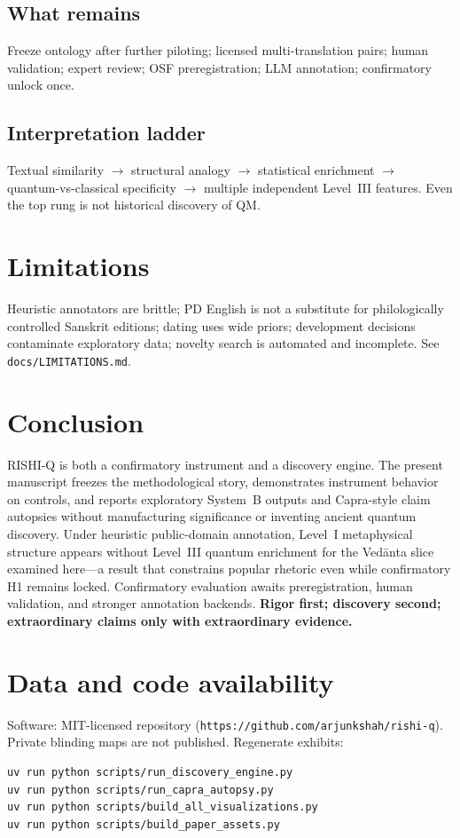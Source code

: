 \documentclass[11pt]{article}
\begin{document}
\subsection{What remains}
Freeze ontology after further piloting; licensed multi-translation pairs; human validation; expert review; OSF preregistration; LLM annotation; confirmatory unlock once.

\subsection{Interpretation ladder}
Textual similarity $\rightarrow$ structural analogy $\rightarrow$ statistical enrichment $\rightarrow$ quantum-vs-classical specificity $\rightarrow$ multiple independent Level~III features.
Even the top rung is not historical discovery of QM.

\section{Limitations}
Heuristic annotators are brittle; PD English is not a substitute for philologically controlled Sanskrit editions; dating uses wide priors; development decisions contaminate exploratory data; novelty search is automated and incomplete.
See \texttt{docs/LIMITATIONS.md}.

\section{Conclusion}
RISHI-Q is both a confirmatory instrument and a discovery engine.
The present manuscript freezes the methodological story, demonstrates instrument behavior on controls, and reports exploratory System~B outputs and Capra-style claim autopsies without manufacturing significance or inventing ancient quantum discovery.
Under heuristic public-domain annotation, Level~I metaphysical structure appears without Level~III quantum enrichment for the Ved\={a}nta slice examined here---a result that constrains popular rhetoric even while confirmatory H1 remains locked.
Confirmatory evaluation awaits preregistration, human validation, and stronger annotation backends.
\textbf{Rigor first; discovery second; extraordinary claims only with extraordinary evidence.}

\section*{Data and code availability}
Software: MIT-licensed repository (\texttt{https://github.com/arjunkshah/rishi-q}).
Private blinding maps are not published.
Regenerate exhibits:
\begin{verbatim}
uv run python scripts/run_discovery_engine.py
uv run python scripts/run_capra_autopsy.py
uv run python scripts/build_all_visualizations.py
uv run python scripts/build_paper_assets.py
\end{verbatim}
\end{document}
